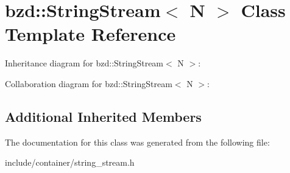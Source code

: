 \hypertarget{classbzd_1_1StringStream}{}\section{bzd\+:\+:String\+Stream$<$ N $>$ Class Template Reference}
\label{classbzd_1_1StringStream}


Inheritance diagram for bzd\+:\+:String\+Stream$<$ N $>$\+:


Collaboration diagram for bzd\+:\+:String\+Stream$<$ N $>$\+:
\subsection*{Additional Inherited Members}


The documentation for this class was generated from the following file\+:\begin{DoxyCompactItemize}
\item 
include/container/string\+\_\+stream.\+h\end{DoxyCompactItemize}
